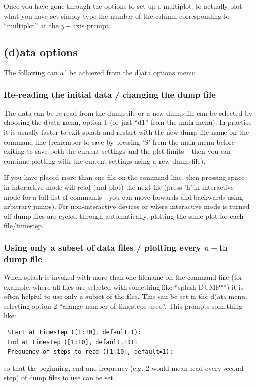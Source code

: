 \documentclass[a4paper,11pt]{article}
\begin{document}
Once you have gone through the options to set up a multiplot, to actually plot what you have set simply type the number of the column corresponding to ``multiplot'' at the $y-$axis prompt.

\subsection{(d)ata options}
The following can all be achieved from the d)ata options menu:

\subsubsection{ Re-reading the initial data / changing the dump file}
\label{sec:d1}
 The data can be re-read from the dump file or a new dump file can be selected by choosing  the d)ata menu, option 1 (or just ``d1'' from the main menu). In practise it is usually faster to exit splash and restart with the new dump file name on the command line (remember to save by pressing 'S' from the main menu before exiting to save both the current settings and the plot limits -- then you can continue plotting with the current settings using a new dump file).
 
 If you have placed more than one file on the command line, then pressing space in interactive mode will read (and plot) the next file (press 'h' in interactive mode for a full list of commands - you can move forwards and backwards using arbitrary jumps). For non-interactive devices or where interactive mode is turned off dump files are cycled through automatically, plotting the same plot for each file/timestep.
 
\subsubsection{ Using only a subset of data files / plotting every $n-$th dump file}
\label{sec:subsetofsteps}
 When splash is invoked with more than one filename on the command line (for example, where all files are selected with something like ``splash DUMP*'') it is often helpful to use only a subset of the files. This can be set in the d)ata menu, selecting option 2 ``change number of timesteps used''. This prompts something like:
\begin{verbatim}
 Start at timestep ([1:10], default=1):
 End at timestep ([1:10], default=10):
 Frequency of steps to read ([1:10], default=1):
\end{verbatim}
so that the beginning, end and frequency (e.g. 2 would mean read every second step) of dump files to use can be set.
\end{document}
